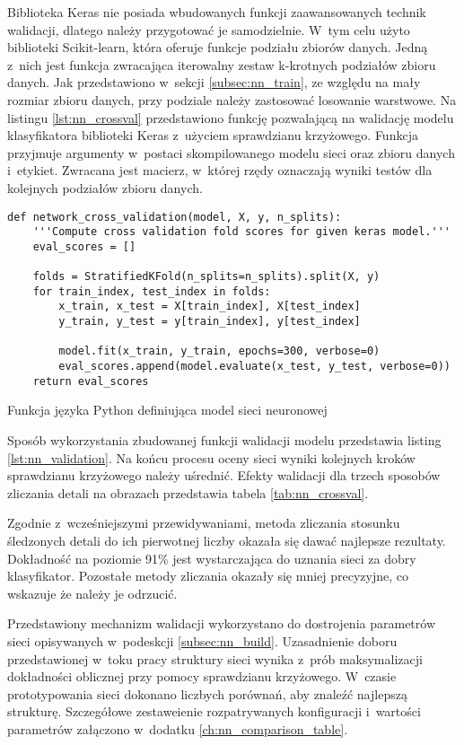 Biblioteka Keras nie posiada wbudowanych funkcji zaawansowanych technik
walidacji, dlatego należy przygotować je samodzielnie.
W~tym celu użyto biblioteki Scikit-learn, która oferuje funkcje podziału
zbiorów danych.
Jedną z~nich jest funkcja zwracająca iterowalny zestaw k-krotnych
podziałów zbioru danych.
Jak przedstawiono w~sekcji \ref{subsec:nn_train}, ze względu na mały rozmiar
zbioru danych, przy podziale należy zastosować losowanie warstwowe.
Na listingu \ref{lst:nn_crossval} przedstawiono funkcję pozwalającą na
walidację modelu klasyfikatora biblioteki Keras z~użyciem sprawdzianu
krzyżowego.
Funkcja przyjmuje argumenty w~postaci skompilowanego modelu sieci oraz
zbioru danych i~etykiet.
Zwracana jest macierz, w~której rzędy oznaczają wyniki testów dla kolejnych
podziałów zbioru danych.
\begin{listing}[htb]
\begin{verbatim}
def network_cross_validation(model, X, y, n_splits):
    '''Compute cross validation fold scores for given keras model.'''
    eval_scores = []

    folds = StratifiedKFold(n_splits=n_splits).split(X, y)
    for train_index, test_index in folds:
        x_train, x_test = X[train_index], X[test_index]
        y_train, y_test = y[train_index], y[test_index]

        model.fit(x_train, y_train, epochs=300, verbose=0)
        eval_scores.append(model.evaluate(x_test, y_test, verbose=0))
    return eval_scores
\end{verbatim}
\caption{Funkcja języka Python definiująca model sieci neuronowej}
\label{lst:nn_crossval}
\end{listing}
Sposób wykorzystania zbudowanej funkcji walidacji modelu przedstawia
listing \ref{lst:nn_validation}.
Na końcu procesu oceny sieci wyniki kolejnych kroków sprawdzianu krzyżowego
należy uśrednić.
Efekty walidacji dla trzech sposobów zliczania detali na obrazach przedstawia
tabela \ref{tab:nn_crossval}.

Zgodnie z~wcześniejszymi przewidywaniami, metoda zliczania stosunku śledzonych
detali do ich pierwotnej liczby okazała się dawać najlepsze rezultaty.
Dokładność na poziomie 91\% jest wystarczająca do uznania sieci za dobry
klasyfikator.
Pozostałe metody zliczania okazały się mniej precyzyjne, co wskazuje że należy
je odrzucić.

Przedstawiony mechanizm walidacji wykorzystano do dostrojenia parametrów
sieci opisywanych w~podeskcji \ref{subsec:nn_build}.
Uzasadnienie doboru przedstawionej w~toku pracy struktury sieci wynika z~prób
maksymalizacji dokładności oblicznej przy pomocy sprawdzianu krzyżowego.
W~czasie prototypowania sieci dokonano liczbych porównań, aby znaleźć
najlepszą strukturę.
Szczegółowe zestaweienie rozpatrywanych konfiguracji i~wartości parametrów
załączono w~dodatku \ref{ch:nn_comparison_table}.

